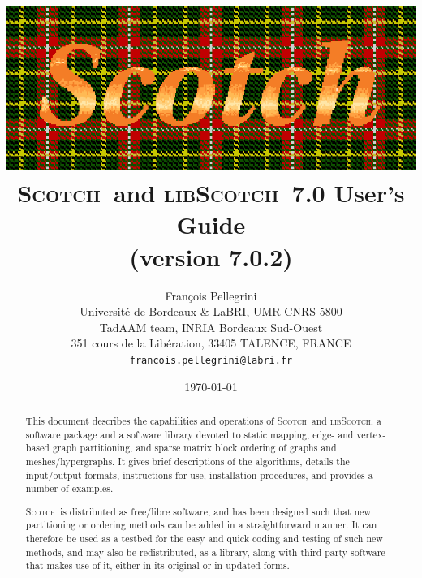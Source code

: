\documentclass{article}
\newcommand{\scotch}{\textsc{Scotch}}               %
\newcommand{\libscotch}{\textsc{libScotch}}         %
\newcommand{\scotchver}{7.0}
\newcommand{\scotchversub}{7.0.2}
\begin{document}
\date{\today}

\title{\includegraphics{../misc/scotch_logo_color.ps}\\[1em]
       {\LARGE\bf \scotch\ and \libscotch\ \textsc{\scotchver} User's Guide}\\[1em]%
       {\normalsize (version \scotchversub)}
}

\author{Fran\c cois Pellegrini\\
Universit\'e de Bordeaux \& LaBRI, UMR CNRS 5800\\
TadAAM team, INRIA Bordeaux Sud-Ouest\\
351 cours de la Lib\'eration, 33405 TALENCE, FRANCE\\
{\tt francois.pellegrini@labri.fr}}

\maketitle

\begin{abstract}
This document describes the capabilities and operations of
\scotch\ and \libscotch, a software package and a software library
devoted to static mapping, edge- and vertex-based graph partitioning,
and sparse matrix block ordering of graphs and meshes/hypergraphs. It
gives brief descriptions of the algorithms, details the input/output
formats, instructions for use, installation procedures, and provides a
number of examples.

\scotch\ is distributed as free/libre software, and has been
designed such that new partitioning or ordering methods can be added
in a straightforward manner. It can therefore be used as a testbed for
the easy and quick coding and testing of such new methods, and may
also be redistributed, as a library, along with third-party software
that makes use of it, either in its original or in updated forms.
\end{abstract}
\end{document}
